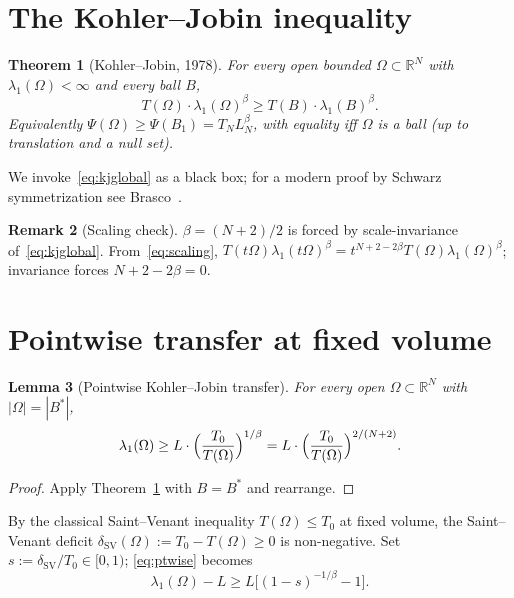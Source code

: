 \documentclass[11pt]{article}
\newtheorem{theorem}{Theorem}
\newtheorem{lemma}[theorem]{Lemma}
\theoremstyle{definition}
\newtheorem{remark}[theorem]{Remark}
\newcommand{\R}{\mathbb{R}}
\begin{document}
\section{The Kohler--Jobin inequality}\label{sec:kj}

\begin{theorem}[Kohler--Jobin, 1978]\label{thm:kj}
For every open bounded $\Omega\subset\R^N$ with $\lambda_1(\Omega)<\infty$
and every ball $B$,
\begin{equation}\label{eq:kjglobal}
T(\Omega)\cdot\lambda_1(\Omega)^{\beta}
\ge T(B)\cdot\lambda_1(B)^{\beta}.
\end{equation}
Equivalently $\Psi(\Omega)\ge\Psi(B_1)=T_N L_N^{\beta}$, with equality
iff $\Omega$ is a ball (up to translation and a null set).
\end{theorem}

We invoke~\eqref{eq:kjglobal} as a black box; for a modern proof by
Schwarz symmetrization see Brasco~\cite[Theorem~3.3]{Brasco2014}.

\begin{remark}[Scaling check]\label{rem:scaling}
$\beta=(N+2)/2$ is forced by scale-invariance of~\eqref{eq:kjglobal}.
From~\eqref{eq:scaling}, $T(t\Omega)\lambda_1(t\Omega)^\beta =
t^{N+2-2\beta}T(\Omega)\lambda_1(\Omega)^\beta$; invariance forces
$N+2-2\beta=0$.
\end{remark}

\section{Pointwise transfer at fixed volume}

\begin{lemma}[Pointwise Kohler--Jobin transfer]\label{lem:pointwise}
For every open $\Omega\subset\R^N$ with $|\Omega|=|B^*|$,
\begin{equation}\label{eq:ptwise}
\lambda_1(\Omega)\ge L\cdot\Bigl(\frac{T_0}{T(\Omega)}\Bigr)^{1/\beta}
=L\cdot\Bigl(\frac{T_0}{T(\Omega)}\Bigr)^{2/(N+2)}.
\end{equation}
\end{lemma}

\begin{proof}
Apply Theorem~\ref{thm:kj} with $B=B^*$ and rearrange.
\end{proof}

By the classical Saint--Venant inequality $T(\Omega)\le T_0$ at fixed
volume, the Saint--Venant deficit
$\delta_{\mathrm{SV}}(\Omega):=T_0-T(\Omega)\ge0$ is non-negative. Set
$s:=\delta_{\mathrm{SV}}/T_0\in[0,1)$; \eqref{eq:ptwise} becomes
\begin{equation}\label{eq:ptwises}
\lambda_1(\Omega)-L\ge L\bigl[(1-s)^{-1/\beta}-1\bigr].
\end{equation}
\end{document}
